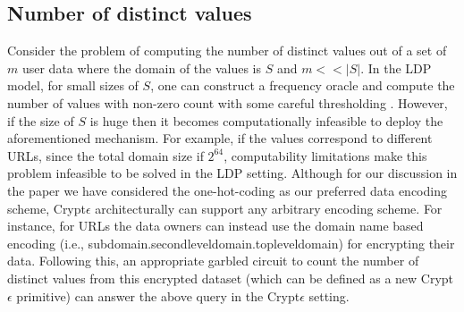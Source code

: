 \subsection*{Number of distinct values}
Consider the problem of computing the number of distinct values out of a set of $m$ user data where the domain of the values is $S$ and $m<<|S|$. In the LDP model, for small sizes of $S$, one can construct a frequency oracle and compute the number of values with non-zero count with some careful thresholding \cite{LDP1}. However, if the size of $S$ is huge then it becomes computationally infeasible to deploy the aforementioned mechanism. For example, if the values correspond to different URLs, since the total domain size if $2^{64}$, computability limitations make this problem infeasible to be solved in the LDP setting. Although for our discussion in the paper we have considered the one-hot-coding as our preferred data encoding scheme, Crypt$\epsilon$ architecturally can support any arbitrary encoding scheme.  For instance, for URLs the data owners can instead use the domain name based encoding (i.e., subdomain.secondleveldomain.topleveldomain) for encrypting their data. Following this, an appropriate garbled circuit to count the number of distinct values from this encrypted dataset (which can be defined as a new Crypt$\epsilon$ primitive) can answer the above query in the Crypt$\epsilon$ setting.

\begin{comment}\subsection{Answering queries with disjunctions in predicate} Now let us consider a DNF query predicate $\phi=\phi_1 \vee \phi_2$ where $\phi_1=(A_1==v_1 \wedge \ldots \wedge A_n==v_n)$ and $\phi_2=(A'_1==v'_1 \wedge \ldots \wedge A'_n==v'_n)$ are two conjunctive clauses. For a given record assume, \begin{gather*}\mathbf{d}=\mathbf{c_1}\oplus \mathbf{c_2}-labMult(\mathbf{c_1,c_2}) \\
\mathbf{c_1}=genLabMult(\mathbf{\tilde{R}}_{A1}[v_1], \ldots ,\mathbf{\tilde{R}}_{An}[v_n] ) \\ \mathbf{c_1}=genLabMult(\mathbf{\tilde{R}}_{A1}[v_1], \ldots ,\mathbf{\tilde{R}}_{An}[v_n] )\end{gather*} Note that $d=1$  only iff  the record satisfies $\phi$. Thus for a two clause  DNF predicate as above, the optimized Filter transformation takes as input $x \times y$ encrypted table $\tilde{\mathbf{T}}$ with attribute set $\bigcup_{i=1}^n Attribute(\phi_i)$ and outputs a $x \times 1$ encrypted table $\mathbf{\tilde{T}}'$ such that \begin{gather} \mathbf{\tilde{T}}'[i]= \mathbf{c_1}\oplus \mathbf{c_2}-labMult(\mathbf{c_1,c_2}) \\
\mathbf{c_1}=genLabMult(\mathbf{\tilde{R}}_{A1}[v_1], \ldots ,\mathbf{\tilde{R}}_{An}[v_n] ) \\ \mathbf{c_1}=genLabMult(\mathbf{\tilde{R}}_{A1}[v_1], \ldots ,\mathbf{\tilde{R}}_{An}[v_n] )\end{gather} For $t>2$ clauses in a DNF, apply the Filter transformation pairwise for $\lceil \log t \rceil$ iterations. 
\end{comment}